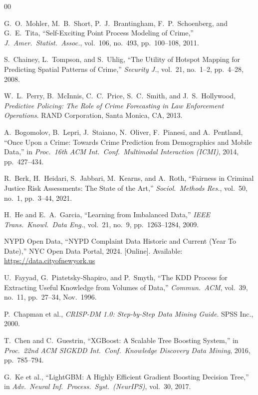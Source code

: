 \documentclass[conference]{IEEEtran}
\begin{document}
\begin{thebibliography}{00}

G.~O.~Mohler, M.~B.~Short, P.~J.~Brantingham, F.~P.~Schoenberg, and G.~E.~Tita, ``Self-Exciting Point Process Modeling of Crime,'' \textit{J.\ Amer.\ Statist.\ Assoc.}, vol.~106, no.~493, pp.~100--108, 2011.

S.~Chainey, L.~Tompson, and S.~Uhlig, ``The Utility of Hotspot Mapping for Predicting Spatial Patterns of Crime,'' \textit{Security J.}, vol.~21, no.~1--2, pp.~4--28, 2008.

W.~L.~Perry, B.~McInnis, C.~C.~Price, S.~C.~Smith, and J.~S.~Hollywood, \textit{Predictive Policing: The Role of Crime Forecasting in Law Enforcement Operations}. RAND Corporation, Santa Monica, CA, 2013.

A.~Bogomolov, B.~Lepri, J.~Staiano, N.~Oliver, F.~Pianesi, and A.~Pentland, ``Once Upon a Crime: Towards Crime Prediction from Demographics and Mobile Data,'' in \textit{Proc.\ 16th ACM Int.\ Conf.\ Multimodal Interaction (ICMI)}, 2014, pp.~427--434.

R.~Berk, H.~Heidari, S.~Jabbari, M.~Kearns, and A.~Roth, ``Fairness in Criminal Justice Risk Assessments: The State of the Art,'' \textit{Sociol.\ Methods Res.}, vol.~50, no.~1, pp.~3--44, 2021.

H.~He and E.~A.~Garcia, ``Learning from Imbalanced Data,'' \textit{IEEE Trans.\ Knowl.\ Data Eng.}, vol.~21, no.~9, pp.~1263--1284, 2009.

NYPD Open Data, ``NYPD Complaint Data Historic and Current (Year To Date),'' NYC Open Data Portal, 2024. [Online]. Available: \url{https://data.cityofnewyork.us}

U.~Fayyad, G.~Piatetsky-Shapiro, and P.~Smyth, ``The KDD Process for Extracting Useful Knowledge from Volumes of Data,'' \textit{Commun.\ ACM}, vol.~39, no.~11, pp.~27--34, Nov.\ 1996.

P.~Chapman et al., \textit{CRISP-DM 1.0: Step-by-Step Data Mining Guide}. SPSS Inc., 2000.

T.~Chen and C.~Guestrin, ``XGBoost: A Scalable Tree Boosting System,'' in \textit{Proc.\ 22nd ACM SIGKDD Int.\ Conf.\ Knowledge Discovery Data Mining}, 2016, pp.~785--794.

G.~Ke et al., ``LightGBM: A Highly Efficient Gradient Boosting Decision Tree,'' in \textit{Adv.\ Neural Inf.\ Process.\ Syst.\ (NeurIPS)}, vol.~30, 2017.


\end{thebibliography}
\end{document}
